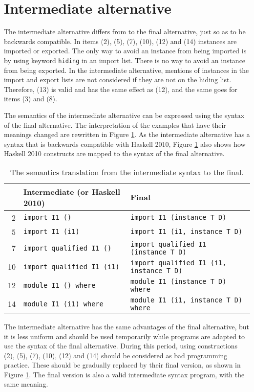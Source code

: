 \documentclass[msc]{ppgccufmg}
\begin{document}
\section{Intermediate alternative}
The intermediate alternative differs from to the final alternative, just so as to be backwards compatible.  In items (2), (5), (7), (10), (12) and (14) instances are
imported or exported.  The only way to avoid an instance from being imported
is by using keyword \texttt{hiding} in an import list.  There is no way to
avoid an instance from being exported.
In the intermediate alternative, mentions of instances in the import and export lists are not considered if they are not on the hiding list.
Therefore, (13) is valid and has the same effect as (12), and the same goes for items (3) and (8).

The semantics of the intermediate alternative can be expressed using the syntax
of the final
alternative.  The interpretation of the examples that have their meanings changed
are rewritten in Figure \ref{tab}.  As the intermediate alternative has a syntax
that is backwards
compatible with Haskell 2010, Figure \ref{tab} also shows how Haskell 2010
constructs are mapped to the syntax of the final alternative.

\begin{table}
\caption{The semantics translation from the intermediate syntax to the
  final.\label{tab}}
\begin{tabular}{|r|l|l|}
\hline
& \textbf{Intermediate (or Haskell 2010)} & \textbf{Final} \\
\hline
2 & \texttt{import I1 ()} & \texttt{import I1 (instance T D)}\\
5 & \texttt{import I1 (i1)} & \texttt{import I1 (i1, instance T D)}\\
7 & \texttt{import qualified I1 ()} & \texttt{import qualified I1 (instance T D)}\\
10 & \texttt{import qualified I1 (i1)} & \texttt{import qualified I1 (i1, instance T D)}\\
12 & \texttt{module I1 () where} & \texttt{module I1 (instance T D) where}\\
14 & \texttt{module I1 (i1) where} & \texttt{module I1 (i1, instance T D)
    where}\\
\hline
\end{tabular}
\end{table}

The intermediate alternative has the same advantages of the final alternative, but it is less
uniform and should be used temporarily while programs are adapted to use
the syntax of the final alternative.  During this period, using constructions (2), (5), (7), (10), (12) and (14)
should be considered as bad programming practice.  These should be gradually
replaced by their final version, as shown in Figure \ref{tab}.  The final
version is also a valid intermediate syntax program, with the same meaning.
\end{document}
